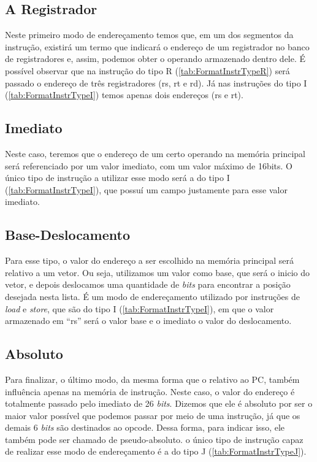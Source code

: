 \documentclass[
	12pt,				%
	oneside,
	a4paper,			%
	english,			%
	french,				%
	spanish,			%
	brazil,				%
	]{abntex2}
\begin{document}
\subsection{A Registrador}
Neste primeiro modo de endereçamento temos que, em um dos segmentos da instrução, existirá um termo que indicará o endereço de um registrador no banco de registradores e, assim, podemos obter o operando armazenado dentro dele. É possível observar que na instrução do tipo R (\autoref{tab:FormatInstrTypeR}) será passado o endereço de três registradores (rs, rt e rd). Já nas instruções do tipo I (\autoref{tab:FormatInstrTypeI}) temos apenas dois endereços (rs e rt).

\subsection{Imediato}
Neste caso, teremos que o endereço de um certo operando na memória principal será referenciado por um valor imediato, com um valor máximo de 16bits. O único tipo de instrução a utilizar esse modo será a do tipo I (\autoref{tab:FormatInstrTypeI}), que possuí um campo justamente para esse valor imediato.

\subsection{Base-Deslocamento}
Para esse tipo, o valor do endereço a ser escolhido na memória principal será relativo a um vetor. Ou seja, utilizamos um valor como base, que será o inicio do vetor, e depois deslocamos uma quantidade de \emph{bits} para encontrar a posição desejada nesta lista. É um modo de endereçamento utilizado por instruções de \emph{load} e \emph{store}, que são do tipo I (\autoref{tab:FormatInstrTypeI}), em que o valor armazenado em ``rs'' será o valor base e o imediato o valor do deslocamento.

\subsection{Absoluto}
Para finalizar, o último modo, da mesma forma que o relativo ao PC, também influência apenas na memória de instrução. Neste caso, o valor do endereço é totalmente passado pelo imediato de 26 \emph{bits}. Dizemos que ele é absoluto por ser o maior valor possível que podemos passar por meio de uma instrução, já que os demais 6 \emph{bits} são destinados ao opcode. Dessa forma, para indicar isso, ele também pode ser chamado de pseudo-absoluto. o único tipo de instrução capaz de realizar esse modo de endereçamento é a do tipo J (\autoref{tab:FormatInstrTypeJ}).
\end{document}
